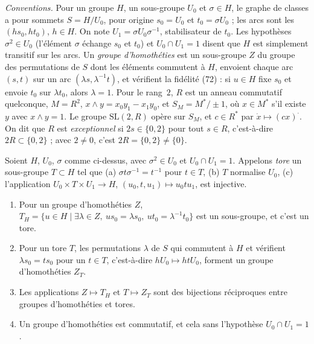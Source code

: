 \noindent\emph{Conventions.} Pour un groupe $H$, un sous-groupe $U_0$ et $\sigma \in H$, le graphe de classes a pour sommets $S = H/U_0$, pour origine $s_0 = U_0$ et $t_0 = \sigma U_0$ ; les arcs sont les $(hs_0, ht_0)$, $h \in H$. On note $U_1 = \sigma U_0 \sigma^{-1}$, stabilisateur de $t_0$. Les hypothèses $\sigma^2 \in U_0$ (l'élément $\sigma$ échange $s_0$ et $t_0$) et $U_0 \cap U_1 = 1$ disent que $H$ est simplement transitif sur les arcs. Un \emph{groupe d'homothéties} est un sous-groupe $Z$ du groupe des permutations de $S$ dont les éléments commutent à $H$, envoient chaque arc $(s, t)$ sur un arc $(\lambda s, \lambda^{-1} t)$, et vérifient la fidélité (72) : si $u \in H$ fixe $s_0$ et envoie $t_0$ sur $\lambda t_0$, alors $\lambda = 1$. Pour le rang~$2$, $R$ est un anneau commutatif quelconque, $M = R^2$, $x \wedge y = x_0y_1 - x_1y_0$, et $S_M = M^*/\pm 1$, où $x \in M^*$ s'il existe $y$ avec $x \wedge y = 1$. Le groupe $\mathrm{SL}(2, R)$ opère sur $S_M$, et $c \in R^*$ par $\dot x \mapsto (cx)^{\cdot}$. On dit que $R$ est \emph{exceptionnel} si $2s \in \{0, 2\}$ pour tout $s \in R$, c'est-à-dire $2R \subset \{0, 2\}$ ; avec $2 \neq 0$, c'est $2R = \{0, 2\} \neq \{0\}$.

\begin{enonce}
Soient $H$, $U_0$, $\sigma$ comme ci-dessus, avec $\sigma^2 \in U_0$ et $U_0 \cap U_1 = 1$. Appelons \emph{tore} un sous-groupe $T \subset H$ tel que (a) $\sigma t \sigma^{-1} = t^{-1}$ pour $t \in T$, (b) $T$ normalise $U_0$, (c) l'application $U_0 \times T \times U_1 \to H$, $(u_0, t, u_1) \mapsto u_0tu_1$, est injective.
\begin{enumerate}
\item Pour un groupe d'homothéties $Z$, $T_H = \{u \in H \mid \exists \lambda \in Z,\ us_0 = \lambda s_0,\ ut_0 = \lambda^{-1}t_0\}$ est un sous-groupe, et c'est un tore.
\item Pour un tore $T$, les permutations $\lambda$ de $S$ qui commutent à $H$ et vérifient $\lambda s_0 = ts_0$ pour un $t \in T$, c'est-à-dire $hU_0 \mapsto htU_0$, forment un groupe d'homothéties $Z_T$.
\item Les applications $Z \mapsto T_H$ et $T \mapsto Z_T$ sont des bijections réciproques entre groupes d'homothéties et tores.
\item Un groupe d'homothéties est commutatif, et cela sans l'hypothèse $U_0 \cap U_1 = 1$.
\end{enumerate}
\end{enonce}

